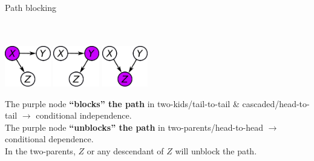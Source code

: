 \documentclass{beamer}
\begin{document}
\begin{frame}{Path blocking}
\begin{center}
  \hspace{3mm}{\bf Two-kids}\hspace{6mm}{\bf Cascaded}\hspace{16mm}{\bf Two-parents}\vspace{1mm}\\
  \hspace{3mm}{\small tail-to-tail}\hspace{6mm}{\small head-to-tail}\hspace{18mm}{\small head-to-head}\vspace{2mm}\\
  \includegraphics[width=0.15\textwidth]{fig/twokids-xyz-color.pdf}\hspace{4mm}%
  \includegraphics[width=0.15\textwidth]{fig/cascaded-xyz-color.pdf}\hspace{16mm}%
  \includegraphics[width=0.15\textwidth]{fig/twoparents-xyz-color.pdf}\\
\end{center}
\pause
 {The purple node {\bf ``blocks'' the path} in two-kids/tail-to-tail \& cascaded/head-to-tail $\rightarrow$ conditional independence.\vspace{7mm}\\
 \pause
 The purple node {\bf ``unblocks'' the path} in two-parents/head-to-head $\rightarrow$ conditional dependence.\\}
 \pause
 In the two-parents, $Z$ or any descendant of $Z$ will unblock the path.
\end{frame}
\end{document}
